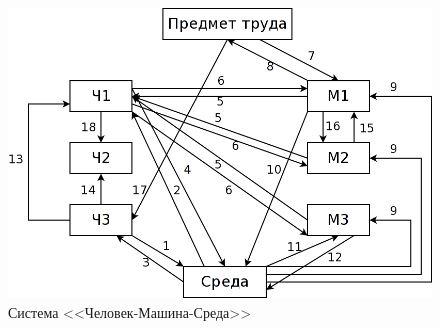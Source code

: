 \begin{figure}[!ht]
    \centering
    \includegraphics[scale=0.4]{graphics/hme.png}
    \caption{Система <<Человек-Машина-Среда>>}
    \label{fig:hme}
\end{figure}

